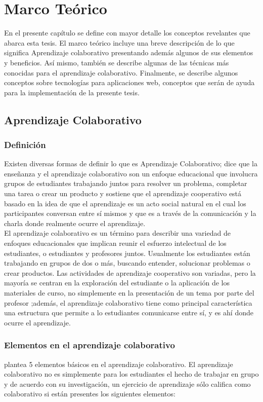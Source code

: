 \chapter{Marco Teórico}
En el presente capítulo se define con mayor detalle los conceptos revelantes que abarca esta tesis. El marco teórico incluye una breve descripción de lo que significa Aprendizaje colaborativo presentando además algunos de sus elementos y beneficios. Así mismo, también se describe algunas de las técnicas más conocidas para el aprendizaje colaborativo. Finalmente, se describe algunos conceptos sobre tecnologías para aplicaciones web, conceptos que serán de ayuda para la implementación de la presente tesis.
\section{Aprendizaje Colaborativo}
\subsection{Definición}
Existen diversas formas de definir lo que es Aprendizaje Colaborativo;  dice que la enseñanza y el aprendizaje colaborativo son un enfoque educacional que involucra grupos de estudiantes trabajando juntos para resolver un problema, completar una tarea o crear un producto y  sostiene que el aprendizaje cooperativo está basado en la idea de que el aprendizaje es un acto social natural en el cual los participantes conversan entre sí mismos y que es a través de la comunicación y la charla donde realmente ocurre el aprendizaje.\\

El aprendizaje colaborativo es un término para describir una variedad de enfoques educacionales que implican reunir el esfuerzo intelectual de los estudiantes, o estudiantes y profesores juntos. Usualmente los estudiantes están trabajando en grupos de dos o más, buscando entender, solucionar problemas o crear productos. Las actividades de aprendizaje cooperativo son variadas, pero la mayoría se centran en la exploración del estudiante o la aplicación de los materiales de curso, no simplemente en la presentación de un tema por parte del profesor \cite{smith_collaborative_1992};además, el aprendizaje colaborativo tiene como principal característica una estructura que permite a lo estudiantes comunicarse entre sí, y es ahí donde ocurre el aprendizaje\cite{golub1988focus}.

\subsection{Elementos en el aprendizaje colaborativo}
\cite{johnson_1984} plantea 5 elementos básicos en el aprendizaje colaborativo. El aprendizaje colaborativo no es simplemente para los estudiantes el hecho de trabajar en grupo y de acuerdo con su investigación,  un ejercicio de aprendizaje sólo califica como colaborativo si están presentes los siguientes elementos:

